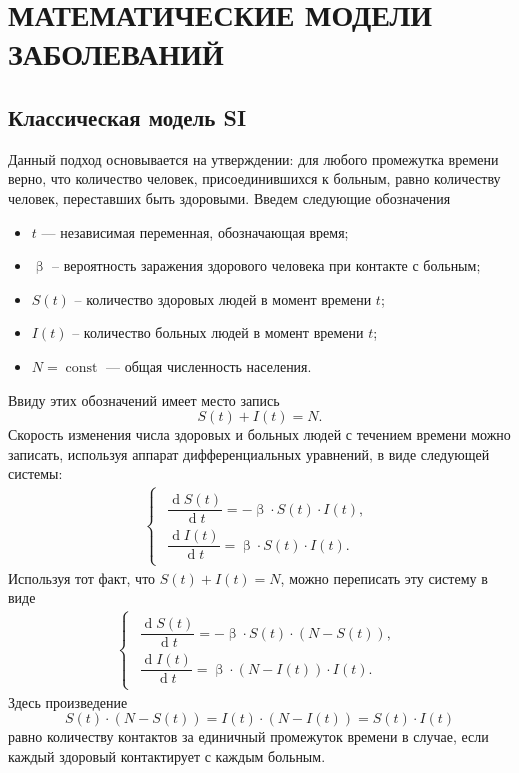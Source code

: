 \documentclass[a4paper, 12pt]{extarticle}
\numberwithin{equation}{section}
\renewcommand{\beta}{\upbeta}
\renewcommand{\d}{\operatorname{d}}
\begin{document}
	\section{МАТЕМАТИЧЕСКИЕ МОДЕЛИ ЗАБОЛЕВАНИЙ}
	\subsection{Классическая модель SI}
	Данный подход основывается на утверждении: для любого промежутка времени верно, что количество человек, присоединившихся к больным, равно количеству человек, переставших быть здоровыми. Введем следующие обозначения
	\begin{itemize}
		\item $t$ --- независимая переменная, обозначающая время;
		\item $\beta$ -- вероятность заражения здорового человека при контакте с больным;
		\item $S(t)$ -- количество здоровых людей в момент времени $t$; 
		\item $I(t)$ -- количество больных людей в момент времени $t$;
		\item $N = \operatorname{const}$ --- общая численность населения.
	\end{itemize}
	Ввиду этих обозначений имеет место запись $$S(t) + I(t) = N.$$
	Скорость изменения числа здоровых и больных людей с течением времени можно записать, используя аппарат дифференциальных уравнений, в виде следующей системы:
	\begin{eqnarray}
		\left\{ 
		\begin{gathered} 
			\begin{aligned}
				\dfrac{\d S(t)}{\d t} = -\beta\cdot S(t)\cdot I(t),\\
				\dfrac{\d I(t)}{\d t} = \beta\cdot S(t)\cdot I(t).
			\end{aligned}
		\end{gathered} 
		\right.
	\end{eqnarray}
	Используя тот факт, что $S(t) + I(t) = N$, можно переписать эту систему в виде
	\begin{eqnarray}
		\left\{ 
		\begin{gathered} 
			\begin{aligned}
		\dfrac{\d S(t)}{\d t} = -\beta \cdot S(t)\cdot (N - S(t)),\\
		\dfrac{\d I(t)}{\d t} = \beta\cdot (N - I(t))\cdot I(t).
			\end{aligned}
		\end{gathered} 
		\right.
	\end{eqnarray}
	Здесь произведение 
	$$S(t) \cdot (N - S(t)) = I(t)\cdot (N - I(t)) = S(t)\cdot I(t)$$
	равно количеству контактов за единичный промежуток времени в случае, если каждый здоровый контактирует с каждым больным. 
	
\end{document}
